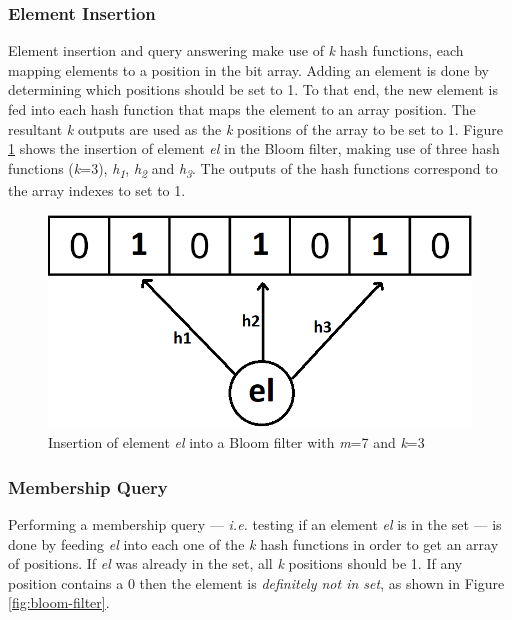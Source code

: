 \subsubsection*{Element Insertion}
Element insertion and query answering make use of \textit{k} hash functions, each mapping elements to a position in the bit array. Adding an element is done by determining which positions should be set to 1. To that end, the new element is fed into each hash function that maps the element to an array position. The resultant \textit{k} outputs are used as the \textit{k} positions of the array to be set to 1. Figure \ref{fig:insertion-bloom-filter} shows the insertion of element \textit{el} in the Bloom filter, making use of three hash functions (\textit{k}=3), \textit{h\textsubscript{1}}, \textit{h\textsubscript{2}} and \textit{h\textsubscript{3}}. The outputs of the hash functions correspond to the array indexes to set to 1.

\begin{figure}[!htb]
    \begin{center}
      \includegraphics[scale=0.4]{figures/insert-bloom.png}
      \caption[Bloom filter insertion]{Insertion of element \textit{el} into a Bloom filter with \textit{m}=7 and \textit{k}=3}
      \label{fig:insertion-bloom-filter}
    \end{center}
\end{figure}

\subsubsection*{Membership Query}
Performing a membership query --- \textit{i.e.} testing if an element \textit{el} is in the set --- is done by feeding \textit{el} into each one of the \textit{k} hash functions in order to get an array of positions. If \textit{el} was already in the set, all \textit{k} positions should be 1. If any position contains a 0 then the element is \textit{definitely not in set}, as shown in Figure \ref{fig:bloom-filter}. 

